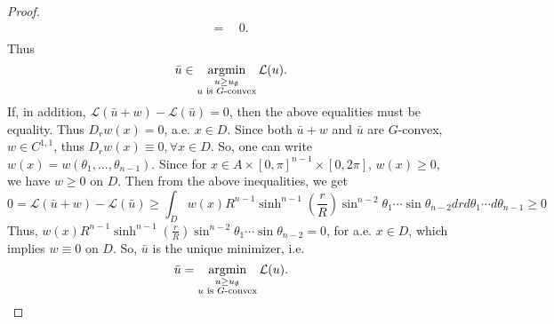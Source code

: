 \begin{proof}
\begin{equation*}
\begin{split}
	=& \ \ 0. \\
	\end{split}
	\end{equation*}
	Thus 
	\begin{equation*}
	\bar{u}\in \argmin\limits_{\substack{u\ge u_{\emptyset} \\ u \text{ is $G$-convex}}} \mathcal{L}(u) .
	\end{equation*}
	If, in addition,  $\mathcal{L}(\bar{u}+w)-\mathcal{L}(\bar{u})=0$, then the above equalities must be equality. Thus $D_rw(x)=0$, a.e. $x \in D$. Since both $\bar{u}+w$ and $\bar{u}$ are $G$-convex, $w \in C^{1,1}$, thus $D_r w(x)\equiv 0, \forall x\in D$. So, one can write $w(x)= w(\theta_1, ..., \theta_{n-1})$. Since for $x\in A\times [0,\pi]^{n-1}\times[0,2\pi]$, $w(x)\ge 0$, we have $w\ge 0$ on $D$. Then from the above inequalities, we get 
	\begin{equation*}
	0=\mathcal{L}(\bar{u}+w)-\mathcal{L}(\bar{u})\ge \int_D w(x)R^{n-1}\sinh^{n-1}(\frac{r}{R})\sin^{n-2}\theta_1\cdots \sin\theta_{n-2} dr d\theta_1 \cdots d\theta_{n-1}\ge 0
	\end{equation*} 
	Thus, $ w(x)R^{n-1}\sinh^{n-1}(\frac{r}{R})\sin^{n-2}\theta_1\cdots \sin\theta_{n-2} =0$, for a.e. $ x \in D$, which implies $w \equiv 0 $ on $D$. So,  $\bar{u}$ is the unique minimizer, i.e. 
	\begin{equation*}
	\bar{u}= \argmin\limits_{\substack{u\ge u_{\emptyset} \\ u \text{ is $G$-convex}}} \mathcal{L}(u).
	\end{equation*}




\end{proof}



